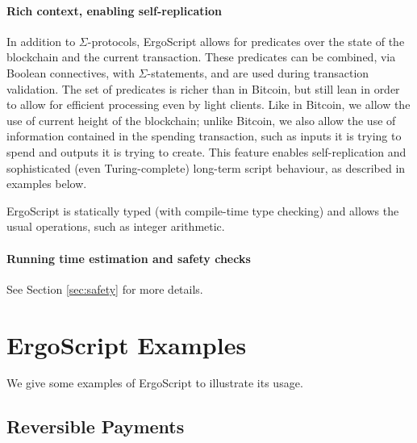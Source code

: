 \documentclass[11pt]{article}
\newcommand{\authnote}[2]{\marginpar{\parbox{\marginparwidth}{\tiny %
  \textsf{#1 {\textcolor{blue}{notes: #2}}}}}%
  \textcolor{blue}{\textbf{\dag}}}
\newcommand{\authnote}[2]{
  \textsf{#1 \textcolor{blue}{: #2}}}
\newcommand{\authnote}[2]{}
\newcommand{\lnote}[1]{{\authnote{\textcolor{orange}{Leo notes}}{#1}}}
\newcommand{\snote}[1]{{\authnote{\textcolor{yellow}{Scalahub notes}}{#1}}}
\newcommand{\langname}{ErgoScript\xspace}
\newcommand{\tnode}{\ensuremath{\mathsf{THRESHOLD}}}
\begin{document}

\paragraph{Rich context, enabling self-replication}
In addition to $\Sigma$-protocols, \langname allows for predicates over the state of the blockchain and the current transaction. These predicates can be combined, via Boolean connectives, with $\Sigma$-statements, and are used during transaction validation. The set of predicates is richer than in Bitcoin, but still lean in order to allow for efficient processing even by light clients. Like in Bitcoin, we allow the use of current height of the blockchain; unlike Bitcoin, we also allow the use of information contained in the spending transaction, such as inputs it is trying to spend and outputs it is trying to create. This feature enables self-replication and sophisticated (even Turing-complete) long-term script behaviour, as described in examples below.

\langname is statically typed (with compile-time type checking) and allows the usual operations, such as integer arithmetic.

\snote{This seems incomplete. In particular, we should describe all context variables and operations allowed, possibly using BNF or some grammar.}


\paragraph{Running time estimation and safety checks}
\lnote{someone should fill this in, because I know very little about it}
See Section \ref{sec:safety} for more details.

\section{\langname Examples}

We give some examples of \langname to illustrate its usage. 
\subsection{Reversible Payments}
\end{document}
